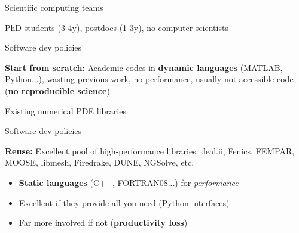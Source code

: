 %
%
%
%
%


\begin{frame}{Scientific computing teams}

PhD students (3-4y), postdocs (1-3y), no computer scientists

\vspace{1cm}

\begin{block}{Software dev policies}

  \textbf{Start from scratch:} Academic codes in \textbf{dynamic languages} (MATLAB, Python...), wasting previous work, no performance, usually not accessible code (\textbf{no reproducible science})

\end{block}

\end{frame}

\begin{frame}{Existing numerical PDE libraries}

  \begin{block}{Software dev policies}

    \textbf{Reuse:} Excellent pool of high-performance libraries: deal.ii, Fenics, FEMPAR, MOOSE, libmesh, Firedrake, DUNE, NGSolve, etc.

  \end{block}


  \begin{itemize}

    \item  \textbf{Static languages} (C++, FORTRAN08...) for \emph{performance}

    \item Excellent if they provide all you need (Python interfaces)

    \item  Far more involved if not (\textbf{productivity loss})

  \end{itemize}

\end{frame}

